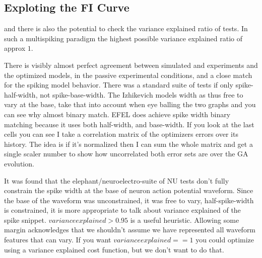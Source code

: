 \subsection{Exploting the FI Curve}

and there is also the potential to check the variance explained ratio of tests. In such a multispiking paradigm the highest possible variance explained ratio of approx $1$. 


There is visibly almost perfect  agreement between simulated and experiments and the optimized models, in the passive experimental conditions, and a close match for the spiking model behavior. There was a standard suite of tests if only spike-half-width, not spike-base-width. The Izhikevich models width as thus free to vary at the base, take that into account when eye balling the two graphs and you can see why almost binary match. EFEL does achieve spike width binary matching because it uses both half-width, and base-width. If you look at the last cells you can see I take a correlation matrix of the optimizers errors over its history. The idea is if it's normalized then I can sum the whole matrix and get a single scaler number to show how uncorrelated both error sets are over the GA evolution. 

It was found that the elephant/neuroelectro-suite of NU tests don't fully constrain the spike width at the base of neuron action potential waveform. Since the base of the waveform was unconstrained, it was free to vary, half-spike-width is constrained, it is more appropriate to talk about variance explained of the spike snippet. $variance explained>0.95$ is a useful heuristic. Allowing some margin acknowledges that we shouldn't assume we have represented all waveform features that can vary. If you want $variance explained==1$   
you could optimize using a variance explained 
cost function, but we don't want to do that.